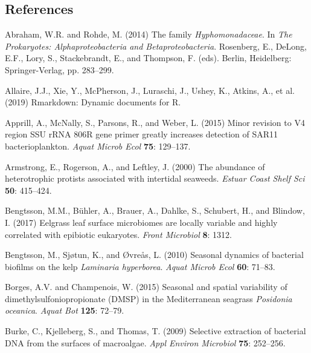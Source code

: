 \documentclass[12pt,]{article}
\begin{document}
\newpage

\hypertarget{references}{%
\subsection{References}\label{references}}

\hypertarget{refs}{}
\leavevmode\hypertarget{ref-Abraham2014}{}%
Abraham, W.R. and Rohde, M. (2014) The family \emph{Hyphomonadaceae}. In
\emph{The Prokaryotes: Alphaproteobacteria and Betaproteobacteria}.
Rosenberg, E., DeLong, E.F., Lory, S., Stackebrandt, E., and Thompson,
F. (eds). Berlin, Heidelberg: Springer-Verlag, pp. 283--299.

\leavevmode\hypertarget{ref-Allaire2019}{}%
Allaire, J.J., Xie, Y., McPherson, J., Luraschi, J., Ushey, K., Atkins,
A., et al. (2019) Rmarkdown: Dynamic documents for R.

\leavevmode\hypertarget{ref-Apprill2015}{}%
Apprill, A., McNally, S., Parsons, R., and Weber, L. (2015) Minor
revision to V4 region SSU rRNA 806R gene primer greatly increases
detection of SAR11 bacterioplankton. \emph{Aquat Microb Ecol}
\textbf{75}: 129--137.

\leavevmode\hypertarget{ref-Armstrong2000}{}%
Armstrong, E., Rogerson, A., and Leftley, J. (2000) The abundance of
heterotrophic protists associated with intertidal seaweeds. \emph{Estuar
Coast Shelf Sci} \textbf{50}: 415--424.

\leavevmode\hypertarget{ref-Bengtsson2017}{}%
Bengtsson, M.M., Bühler, A., Brauer, A., Dahlke, S., Schubert, H., and
Blindow, I. (2017) Eelgrass leaf surface microbiomes are locally
variable and highly correlated with epibiotic eukaryotes. \emph{Front
Microbiol} \textbf{8}: 1312.

\leavevmode\hypertarget{ref-Bengtsson2010}{}%
Bengtsson, M., Sjøtun, K., and Øvreås, L. (2010) Seasonal dynamics of
bacterial biofilms on the kelp \emph{Laminaria hyperborea}. \emph{Aquat
Microb Ecol} \textbf{60}: 71--83.

\leavevmode\hypertarget{ref-Borges2015}{}%
Borges, A.V. and Champenois, W. (2015) Seasonal and spatial variability
of dimethylsulfoniopropionate (DMSP) in the Mediterranean seagrass
\emph{Posidonia oceanica}. \emph{Aquat Bot} \textbf{125}: 72--79.

\leavevmode\hypertarget{ref-Burke2009}{}%
Burke, C., Kjelleberg, S., and Thomas, T. (2009) Selective extraction of
bacterial DNA from the surfaces of macroalgae. \emph{Appl Environ
Microbiol} \textbf{75}: 252--256.
\end{document}
